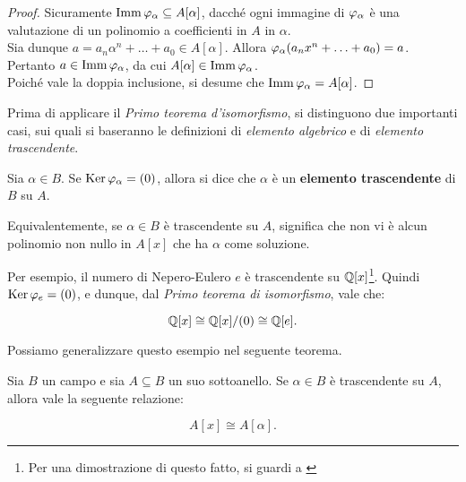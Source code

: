 \begin{proof} Sicuramente $\operatorname{Imm} \varphi_\alpha \subseteq A[\alpha]$,
    dacché ogni immagine di $\varphi_\alpha$ è una valutazione di un
    polinomio a coefficienti in $A$ in $\alpha$. \\

    Sia dunque $a=a_n \alpha^n + \ldots + a_0 \in A[\alpha]$. Allora
    $\varphi_\alpha(a_n x^n + \ldots + a_0) = a$. Pertanto $a \in \operatorname{Imm}
        \varphi_\alpha$, da cui $A[\alpha] \in \operatorname{Imm} \varphi_\alpha$. \\

    Poiché vale la doppia inclusione, si desume che $\operatorname{Imm} \varphi_\alpha =
        A[\alpha]$.
\end{proof}

Prima di applicare il \textit{Primo teorema d'isomorfismo}, si
distinguono due importanti casi, sui quali si baseranno le
definizioni di \textit{elemento algebrico} e di
\textit{elemento trascendente}.

\begin{definition}
    Sia $\alpha \in B$. Se $\operatorname{Ker} \varphi_\alpha = (0)$, allora si
    dice che $\alpha$ è un \textbf{elemento trascendente} di
    $B$ su $A$.
\end{definition}

\begin{remark*}
    Equivalentemente, se $\alpha \in B$ è trascendente su $A$,
    significa che non vi è alcun polinomio non nullo in $A[x]$ che ha $\alpha$
    come soluzione.
\end{remark*}

\begin{example}
    Per esempio, il numero di Nepero-Eulero $e$ è trascendente su $\mathbb{Q}[x]$\footnote{Per una dimostrazione di questo fatto, si
        guardi a \cite[pp.~234-237]{herstein2010algebra}}. Quindi
    $\operatorname{Ker} \varphi_e = (0)$, e dunque, dal \textit{Primo teorema di
        isomorfismo}, vale che:

    \[ \mathbb{Q}[x] \cong \mathbb{Q}[x]/(0) \cong \mathbb Q[e]. \]
\end{example}

Possiamo generalizzare questo esempio nel seguente teorema.

\begin{theorem}
    \label{th:isomorfismo_trascendente}
    Sia $B$ un campo e sia $A \subseteq B$ un suo sottoanello.
    Se $\alpha \in B$ è trascendente su $A$, allora vale
    la seguente relazione:

    \[ A[x] \cong A[\alpha]. \]
\end{theorem}


